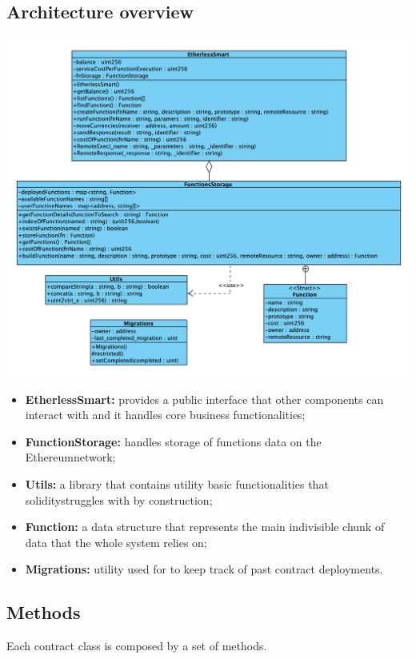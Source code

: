 \subsection{Architecture overview}
\includegraphics[width=\textwidth]{res/img/smart}
\begin{itemize}
	\item \textbf{EtherlessSmart:} provides a public interface that other components can interact with and it handles core business functionalities;
	\item \textbf{FunctionStorage:} handles storage of functions data on the Ethereum\glo network;
	\item \textbf{Utils:} a library that contains utility basic functionalities that solidity\glo struggles with by construction;
	\item \textbf{Function:} a data structure that represents the main indivisible chunk of data that the whole system relies on;
	\item \textbf{Migrations:} utility used for to keep track of past contract deployments.
\end{itemize}
\subsection{Methods}
Each contract class is composed by a set of methods.
